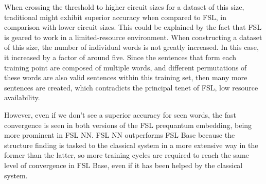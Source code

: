 When crossing the threshold to higher circuit sizes for a dataset of this size, traditional \mya might exhibit superior accuracy when compared to FSL, in comparison with lower circuit sizes. This could be explained by the fact that FSL is geared to work in a limited-resource environment. When constructing a dataset of this size, the number of individual words is not greatly increased. In this case, it increased by a factor of around five. Since the sentences that form each training point are composed of multiple words, and different permutations of these words are also valid sentences within this training set, then many more sentences are created, which contradicts the principal tenet of FSL, low resource availability.



However, even if we don't see a superior accuracy for seen words, the fast convergence is seen in both versions of the FSL prequantum embedding, being more prominent in FSL NN. FSL NN outperforms FSL Base because the structure finding is tasked to the classical system in a more extensive way in the former than the latter, so more training cycles are required to reach the same level of convergence in FSL Base, even if it has been helped by the classical system.

